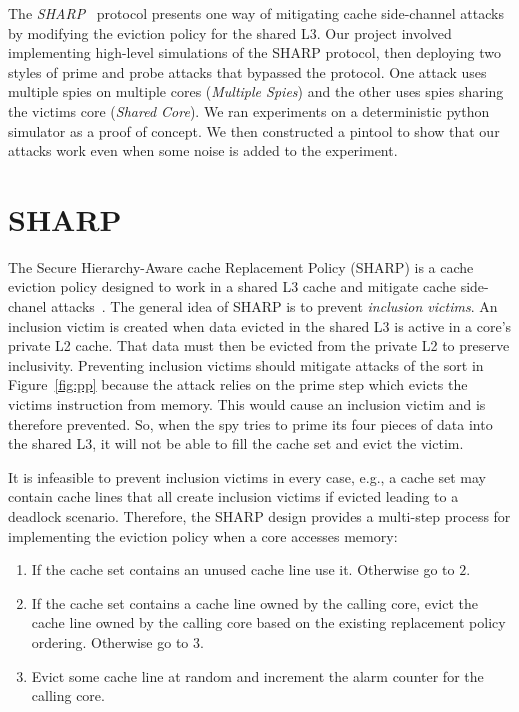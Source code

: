 \documentclass[12pt]{article}
\begin{document}
The {\it SHARP}~\cite{sharp} protocol presents one way of mitigating cache side-channel attacks by modifying the eviction policy for the shared L3.
Our project involved implementing high-level simulations of the SHARP protocol, 
then deploying two styles of prime and probe attacks that bypassed the protocol.
One attack uses multiple spies on multiple cores ({\it Multiple Spies}) and the other uses spies sharing the victims core ({\it Shared Core}).
We ran experiments on a deterministic python simulator as a proof of concept.
We then constructed a pintool to show that our attacks work even when some noise is added to the experiment.


\section{SHARP}

The Secure Hierarchy-Aware cache Replacement Policy (SHARP) is a cache eviction policy designed to work in a shared L3 cache and mitigate cache side-chanel attacks~\cite{sharp}.
The general idea of SHARP is to prevent {\it inclusion victims}.
An inclusion victim is created when data evicted in the shared L3 is active in a core's private L2 cache.
That data must then be evicted from the private L2 to preserve inclusivity.
Preventing inclusion victims should mitigate attacks of the sort in Figure~\ref{fig:pp} because the attack relies on the prime step which evicts the victims instruction from memory.
This would cause an inclusion victim and is therefore prevented.
So, when the spy tries to prime its four pieces of data into the shared L3,
it will not be able to fill the cache set and evict the victim.

It is infeasible to prevent inclusion victims in every case, e.g., a cache set may contain cache lines that all create inclusion victims if evicted leading to a deadlock scenario.
Therefore, the SHARP design provides a multi-step process for implementing the eviction policy when a core accesses memory:

\begin{enumerate}

\item If the cache set contains an unused cache line use it. Otherwise go to $2$.
\item If the cache set contains a cache line owned by the calling core, evict the cache line owned by the calling core based on the existing replacement policy ordering. Otherwise go to $3$.
\item Evict some cache line at random and increment the alarm counter for the calling core.

\end{enumerate}
\end{document}
